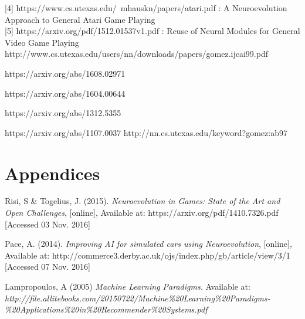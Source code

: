 \documentclass[11pt,a4paper]{article}
\begin{document}
[4] https://www.cs.utexas.edu/~mhauskn/papers/atari.pdf : A Neuroevolution Approach to General Atari Game Playing\\

[5] https://arxiv.org/pdf/1512.01537v1.pdf : Reuse of Neural Modules for General Video Game Playing\\

http://www.cs.utexas.edu/users/nn/downloads/papers/gomez.ijcai99.pdf

https://arxiv.org/abs/1608.02971

https://arxiv.org/abs/1604.00644

https://arxiv.org/abs/1312.5355

https://arxiv.org/abs/1107.0037
http://nn.cs.utexas.edu/keyword?gomez:ab97
\section{Appendices}

\begin{thebibliography}{10}

	Risi, S \& Togelius, J.
	(2015).
	\emph{Neuroevolution in Games: State of the Art and Open Challenges},
  	[online],
  	Available at: https://arxiv.org/pdf/1410.7326.pdf
  	[Accessed 03 Nov. 2016]

	Pace, A. 
	(2014).
	\emph{Improving AI for simulated cars using Neuroevolution},
	[online],
	Available at: http://commerce3.derby.ac.uk/ojs/index.php/gb/article/view/3/1
	[Accessed 07 Nov. 2016]
	
	Lampropoulos, A
	(2005)
	\emph{Machine Learning Paradigms.}
	Available at: \textit{http://file.allitebooks.com/20150722/Machine\%20Learning\%20Paradigms-\%20Applications\%20in\%20Recommender\%20Systems.pdf}
  

\end{thebibliography}
\end{document}
